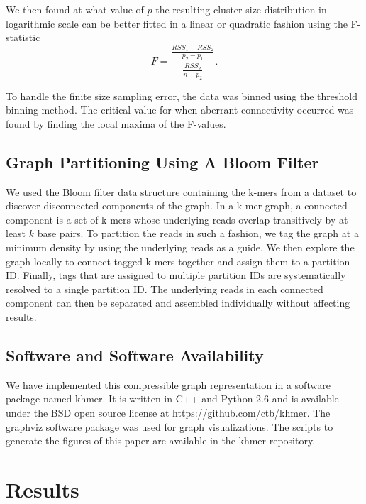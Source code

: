 \documentclass[12pt]{article} \usepackage{simplemargins}
\begin{document}
We then found at what value of $p$ the resulting 
cluster size distribution in logarithmic 
scale can be better fitted in a linear or quadratic fashion using 
the F-statistic
\newline
\newline
\begin{displaymath}
F=\frac{\frac{RSS_1-RSS_2}{p_2-p_1}}{\frac{RSS_2}{n-p_2}}.
\end{displaymath}

To handle the finite size sampling error, the data was binned using the 
threshold binning method\cite{adami2002critical}. The critical value for 
when aberrant connectivity occurred was found by finding the local maxima 
of the F-values.

\subsection{Graph Partitioning Using A Bloom Filter}
We used the Bloom filter data structure containing the k-mers from a dataset 
to discover disconnected components of the graph. In a k-mer graph, a connected 
component is a set of k-mers whose underlying reads overlap 
transitively by at least $k$ base pairs. 
To partition the reads in such a fashion, we tag the 
graph at a minimum density by using the underlying reads as a guide. We then
explore the graph locally to connect tagged k-mers together and assign them 
to a partition ID. Finally, tags that are assigned to multiple partition IDs 
are systematically resolved to a single partition ID.  
The underlying reads in each connected component can then 
be separated and assembled individually without affecting results.

\subsection{Software and Software Availability}
We have implemented this compressible graph representation in a software package
named khmer.
It is written in C++
and Python 2.6 and is available under the BSD open source license at
https://github.com/ctb/khmer.
The graphviz software 
package was used for graph visualizations. The scripts to 
generate the figures of this paper are available in the khmer repository.

\section{Results}
\end{document}
